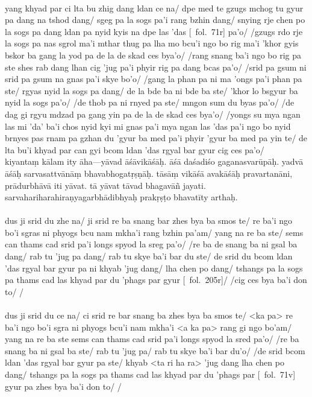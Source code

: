 \documentclass[12pt]{article}
\newcommand{\emdash} {\hspace{0em}—\hspace{0em}}
\begin{document}
\textbf{\TVB}\\
yang khyad par ci lta bu zhig dang ldan ce na/ dpe med te gzugs mchog tu gyur pa dang na tshod dang/ sgeg pa la sogs pa'i rang bzhin dang/ snying rje chen po la sogs pa dang ldan pa nyid kyis na dpe las 'das [\TVB\ fol.\ 71r] pa'o/ /gzugs rdo rje la sogs pa nas sgrol ma'i mthar thug pa lha mo bcu'i ngo bo rig ma'i 'khor gyis bskor ba gang la yod pa de la de skad ces bya'o/ /rang snang ba'i ngo bo rig pa ste shes rab dang lhan cig 'jug pa'i phyir rig pa dang bcas pa'o/ /srid pa gsum ni srid pa gsum na gnas pa'i skye bo'o/ /gang la phan pa ni ma 'ongs pa'i phan pa ste/ rgyas nyid la sogs pa dang/ de la bde ba ni bde ba ste/ 'khor lo bsgyur ba nyid la sogs pa'o/ /de thob pa ni rnyed pa ste/ mngon sum du byas pa'o/ /de dag gi rgyu mdzad pa gang yin pa de la de skad ces bya'o/ /yongs su mya ngan las mi 'da' ba'i chos nyid kyi mi gnas pa'i mya ngan las 'das pa'i ngo bo nyid brnyes pas rnam pa gzhan du 'gyur ba med pa'i phyir 'gyur ba med pa yin te/ de lta bu'i khyad par can gyi bcom ldan 'das rgyal bar gyur cig ces pa'o/\\

kiyantaṃ kālam ity āha\emdash yāvad āśāvikāśāḥ.\footnoteB{
	āśāvikāsāḥ] \corr ; āśāvikāśāḥ \EDD\ \MS
} āśā daśadiśo gaganasvarūpāḥ. yadvā āśāḥ sarvasattvānāṃ bhavabhogatṛṣṇāḥ.\footnoteB{
	°tṛṣṇāḥ] \EDD\ (°tṛṣṇās); tṛṣṇā \MS
} tāsāṃ vikāśā\footnoteB{
	vikāśā] \corr; vikāsā \MS\ \EDD
} avakāśāḥ pravartanāni, prādurbhāvā iti yāvat.
tā yāvat tāvad bhagavāñ jayati.
sarvahariharahiraṇyagarbhādibhyaḥ prakṛṣṭo bhavatīty arthaḥ.\\

\textbf{\TVA}\\
dus ji srid du zhe na/ ji srid re ba snang bar zhes bya ba smos te/ re ba'i ngo bo'i sgras ni phyogs bcu nam mkha'i rang bzhin pa'am/ yang na re ba ste/ sems can thams cad srid pa'i longs spyod la sreg pa'o/ /re ba de snang ba ni gsal ba dang/ rab tu 'jug pa dang/ rab tu skye ba'i bar du ste/ de srid du bcom ldan 'das rgyal bar gyur pa ni khyab 'jug dang/ lha chen po dang/ tshangs pa la sogs pa thams cad las khyad par du 'phags par gyur [\TVA\ fol.\ 205r]/ /cig ces bya ba'i don to/ /\\

\textbf{\TVB}\\
dus ji srid du ce na/ ci srid re bar snang ba zhes bya ba smos te/ <ka pa> re ba'i ngo bo'i sgra ni phyogs bcu'i nam mkha'i <a ka pa> rang gi ngo bo'am/ yang na re ba ste sems can thams cad srid pa'i longs spyod la sred pa'o/ /re ba snang ba ni gsal ba ste/ rab tu 'jug pa/ rab tu skye ba'i bar du'o/ /de srid bcom ldan 'das rgyal bar gyur pa ste/ khyab <ta ri ha ra> 'jug dang lha chen po dang/ tshangs pa la sogs pa thams cad las khyad par du 'phags par [\TVB\ fol.\ 71v] gyur pa zhes bya ba'i don to/ /\\
\end{document}
